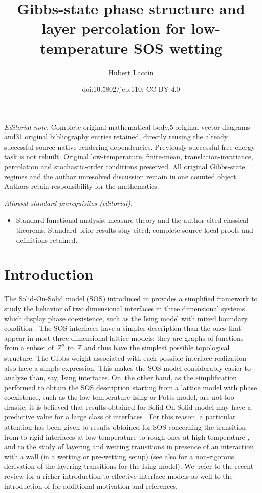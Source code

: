 \documentclass[10pt]{amsart}
\title{Gibbs-state phase structure and layer percolation for low-temperature SOS wetting}
\author{Hubert Lacoin}
\date{doi:10.5802/jep.110; CC BY 4.0}
\numberwithin{equation}{section}
\theoremstyle{plain}
\theoremstyle{definition}
\newcommand{\bbZ}{{\ensuremath{\mathbb Z}} }
\begin{document}
\maketitle
\noindent\textit{Editorial note.} Complete original mathematical body,5 original vector diagrams and31 original bibliography entries retained, directly reusing the already successful source-native rendering dependencies. Previously successful free-energy task is not rebuilt. Original low-temperature, finite-mean, translation-invariance, percolation and stochastic-order conditions preserved. All original Gibbs-state regimes and the author unresolved discussion remain in one counted object. Authors retain responsibility for the mathematics.\par\medskip
\noindent\textit{Allowed standard prerequisites (editorial).}\begin{itemize}
\item Standard functional analysis, measure theory and the author-cited classical theorems. Standard prior results stay cited; complete source-local proofs and definitions retained.
\end{itemize}\medskip
\tableofcontents


\section{Introduction}

The Solid-On-Solid model (SOS) introduced in \cite{cf:BCF, cf:T} provides a simplified framework
to study the behavior of two dimensional interfaces in three dimensional systems which display phase coexistence,
such as the Ising model with mixed boundary condition \cite{cf:Dob}.
The SOS interfaces have a simpler description than the ones that appear in most three dimensional lattice models: they are graphs of functions from a subset of~$\bbZ^2$ to~$\bbZ$ and thus have the simplest possible topological structure. The Gibbs weight associated with each possible interface realization also
have a simple expression.
This makes the SOS model considerably easier to analyze than, say, Ising interfaces. On~the other hand, as the simplification performed to obtain
the SOS description starting from a lattice model with phase coexistence, such as the low temperature Ising or Potts model, are not too drastic,
it is believed that results obtained for Solid-On-Solid model may have a predictive value for a large class of interfaces \cite{cf:BCF,cf:T,cf:WGL}.
For this reason, a particular attention has been given to results obtained for SOS concerning the transition from
to rigid interfaces at low temperature to rough ones at high temperature \cite{cf:BM, cf:FS, cf:Swend}, and to the study of layering and wetting transitions
in presence of an interaction with a wall (in a wetting or pre-wetting setup) \cite{cf:ADM, cf:AY, cf:BMF,cf:CM, cf:CM2, cf:chal,cf:DM} (see also \cite{cf:Bas} for a non-rigorous derivation of the layering transitions for the Ising model).
We~refer to the recent review \cite{cf:IV} for a richer introduction to effective interface models as well to the introduction of \cite{cf:part1}
for additional motivation and references.
\end{document}

